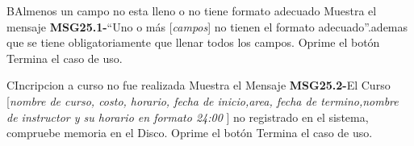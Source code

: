 		\begin{UCtrayectoriaA}{B}{Almenos un campo no esta lleno o no tiene formato adecuado}
			\UCpaso Muestra el mensaje {\bf MSG25.1-}``Uno o más [{\em campos}] no tienen el formato adecuado''.ademas que se tiene obligatoriamente que llenar todos los campos.
			\UCpaso[\UCactor] Oprime el botón 
			\UCpaso[] Termina el caso de uso.
		\end{UCtrayectoriaA}
		
		\begin{UCtrayectoriaA}{C}{Incripcion a curso no fue realizada }
			\UCpaso Muestra el Mensaje {\bf MSG25.2-}El Curso [{\em nombre de curso, costo, horario, fecha de inicio,area, fecha de termino,nombre de instructor y su  horario en formato 24:00 }] no registrado en el sistema, compruebe memoria en el Disco.
			\UCpaso[\UCactor] Oprime el botón 
			\UCpaso[] Termina el caso de uso.
		\end{UCtrayectoriaA}	
